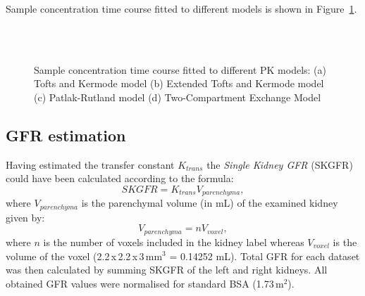 Sample concentration time course fitted to different models is shown in Figure~\ref{fig:fit}. 

\begin{figure}
\captionsetup[subfloat]{captionskip=0.5cm}
	\centering
	\subfloat[TK model fit; $K_{trans}$ = 0.52 min$^{-1}$ ]{\texttt{[image: tk2]}}\hspace{0.03\linewidth}
	\\ \vspace{0.5cm}	
	\subfloat[PR model fit; $K_{trans}$ = 0.19 min$^{-1}$]{\texttt{[image: pr2]}}\hspace{0.03\linewidth}
	\\	
\vspace{0.5cm}
\caption[An example of models fit]{Sample concentration time course fitted to different PK models: (a) Tofts and Kermode model (b) Extended Tofts and Kermode model (c) Patlak-Rutland model (d) Two-Compartment Exchange Model}
\label{fig:fit}
\end{figure}

\subsection{GFR estimation}
Having estimated the transfer constant $K_{trans}$ the \textit{Single Kidney GFR} (SKGFR) could have been calculated according to the formula:
\begin{equation}
SKGFR = K_{trans}V_{parenchyma},
\end{equation}
where $V_{parenchyma}$ is the parenchymal volume (in mL) of the examined kidney given by:
\begin{equation}
V_{parenchyma} = nV_{voxel},
\end{equation}
where $n$ is the number of voxels included in the kidney label whereas $V_{voxel}$ is the volume of the voxel (2.2\,x\,2.2\,x\,3\,mm$^3$ = 0.14252 mL). Total GFR for each dataset was then calculated by summing SKGFR of the left and right kidneys. All obtained GFR values were normalised for standard BSA (1.73\,m$^2$).
